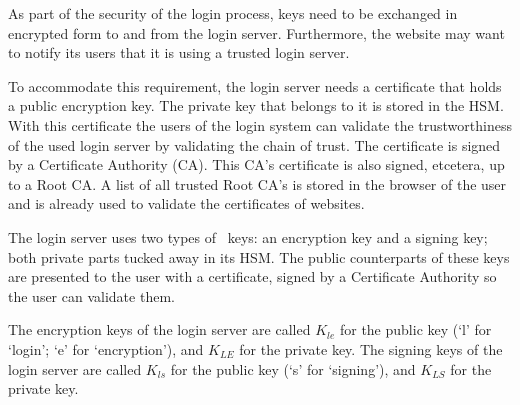 As part of the security of the login process,
keys need to be exchanged in encrypted form to and from the login server.
Furthermore,
the website may want to notify its users that it is using a trusted login server.
\par
To accommodate this requirement, the login server needs a certificate that holds a public encryption key.
The private key that belongs to it is stored in the HSM.
With this certificate the users of the login system can validate the trustworthiness of the used login server
by validating the chain of trust.
The certificate is signed by a Certificate Authority (CA).
This CA's certificate is also signed, etcetera, up to a Root CA.
A list of all trusted Root CA's is stored in the browser of the user
and is already used to validate the certificates of websites.
\par
The login server uses two types of \RSA\ keys:
an encryption key and a signing key; both private parts tucked away in its HSM.
The public counterparts of these keys are presented to the user with a certificate,
signed by a Certificate Authority so the user can validate them.
\par
The encryption keys of the login server are called $K_{le}$ for the public key
(`l' for `login'; `e' for `encryption'),
and $K_{LE}$ for the private key.
The signing keys of the login server are called $K_{ls}$ for the public key
(`s' for `signing'),
and $K_{LS}$ for the private key.
